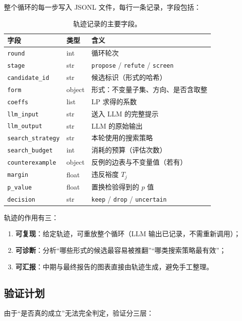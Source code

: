 整个循环的每一步写入 JSONL 文件，每行一条记录，字段包括：

\begin{table}[H]
\centering
\caption{轨迹记录的主要字段。}
\label{tab:trace}
\small
\begin{tabular}{@{}llp{7.2cm}@{}}
\toprule
字段 & 类型 & 含义 \\
\midrule
\texttt{round} & int & 循环轮次 \\
\texttt{stage} & str & \texttt{propose} / \texttt{refute} / \texttt{screen} \\
\texttt{candidate\_id} & str & 候选标识（形式的哈希） \\
\texttt{form} & object & 形式：不变量子集、方向、是否含取整 \\
\texttt{coeffs} & list & LP 求得的系数 \\
\texttt{llm\_input} & str & 送入 LLM 的完整提示 \\
\texttt{llm\_output} & str & LLM 的原始输出 \\
\texttt{search\_strategy} & str & 本轮使用的搜索策略 \\
\texttt{search\_budget} & int & 消耗的预算（评估次数） \\
\texttt{counterexample} & object & 反例的边表与不变量值（若有） \\
\texttt{margin} & float & 违反裕度 $T_j$ \\
\texttt{p\_value} & float & 置换检验得到的 $p$ 值 \\
\texttt{decision} & str & \texttt{keep} / \texttt{drop} / \texttt{uncertain} \\
\bottomrule
\end{tabular}
\end{table}

轨迹的作用有三：
\begin{enumerate}[label=(\arabic*)]
  \item \textbf{可复现}：给定轨迹，可重放整个循环（LLM 输出已记录，不需重新调用）；
  \item \textbf{可诊断}：分析“哪些形式的候选最容易被推翻”“哪类搜索策略最有效”；
  \item \textbf{可汇报}：中期与最终报告的图表直接由轨迹生成，避免手工整理。
\end{enumerate}

\subsection{验证计划}
\label{sec:r-valid}

由于“是否真的成立”无法完全判定，验证分三层：

